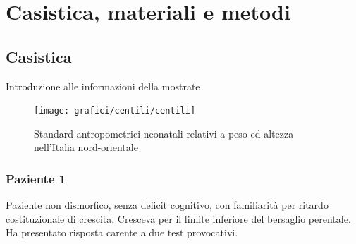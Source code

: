 \chapter{Casistica, materiali e metodi}

\section{Casistica}

Introduzione alle informazioni della mostrate

\begin{figure}[h]
  \begin{center}
      \texttt{[image: grafici/centili/centili]} %
  \end{center}
  \caption{Standard antropometrici neonatali relativi a peso ed altezza nell'Italia nord-orientale}
\end{figure}

\clearpage

\subsection*{Paziente 1} %

Paziente non dismorfico, senza deficit cognitivo, con familiarità per ritardo costituzionale di crescita. Cresceva per il limite inferiore del bersaglio perentale.
Ha presentato risposta carente a due test provocativi.

